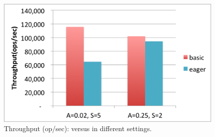 \begin{figure}[htb]
\includegraphics[width=\figw]{Figs/eager-throughput.png}
\caption{Throughput (op/sec): \eager\/ versus \basic\/ in different settings.
}
\label{fig:eager-throughput}
\end{figure}


